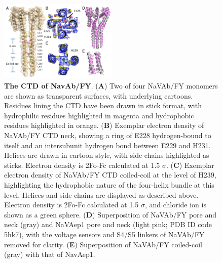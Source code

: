 \begin{refsection}
{\begin{figure}[!htb]
\centering
\includegraphics[width=0.5\textwidth]{navopen/NavOFig4}
\caption[The CTD of NavAb/FY]{\textbf{The CTD of NavAb/FY}. (\textbf{A}) Two of four NaVAb/FY monomers are shown as transparent surfaces, with underlying cartoons. Residues lining the CTD have been drawn in stick format, with hydrophilic residues highlighted in magenta and hydrophobic residues highlighted in orange. (\textbf{B}) Exemplar electron density of NaVAb/FY CTD neck, showing a ring of E228 hydrogen-bound to itself and an intersubunit hydrogen bond between E229 and H231. Helices are drawn in cartoon style, with side chains highlighted as sticks. Electron density is 2Fo-Fc calculated at 1.5 $\sigma$. (\textbf{C}) Exemplar electron density of NaVAb/FY CTD coiled-coil at the level of H239, highlighting the hydrophobic nature of the four-helix bundle at this level. Helices and side chains are displayed as described above. Electron density is 2Fo-Fc calculated at 1.5 $\sigma$, and chloride ion is shown as a green sphere. (\textbf{D}) Superposition of NaVAb/FY pore and neck (gray) and NaVAep1 pore and neck (light pink; PDB ID code 5hk7), with the voltage sensors and S4/S5 linkers of NaVAb/FY removed for clarity. (\textbf{E}) Superposition of NaVAb/FY coiled-coil (gray) with that of NavAep1.}
\label{fig:navofig4}
\end{figure}

}
\end{refsection}
